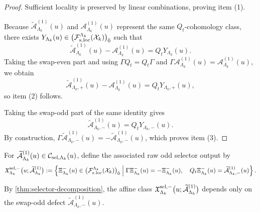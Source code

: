\documentclass[11pt]{article}
\begin{document}
\begin{proof}
Sufficient locality is preserved by linear combinations, proving item (1).

Because
\(
\widetilde{\mathcal A}^{(1)}_{\Lambda_k}(u)
\)
and
\(
\mathcal A^{(1)}_{\Lambda_k}(u)
\)
represent the same \(Q_t\)-cohomology class, there exists
\(
Y_{\Lambda_k}(u)\in
\big(\mathcal F_{\rm s.loc}^{\Lambda_k}(\mathcal X_k)\big)_{\bar 0}
\)
such that
\[
\widetilde{\mathcal A}^{(1)}_{\Lambda_k}(u)
-
\mathcal A^{(1)}_{\Lambda_k}(u)
=
Q_tY_{\Lambda_k}(u).
\]
Taking the swap-even part and using
\(
\Gamma Q_t=Q_t\Gamma
\)
and
\(
\Gamma\mathcal A^{(1)}_{\Lambda_k}(u)=\mathcal A^{(1)}_{\Lambda_k}(u)
\),
we obtain
\[
\widetilde{\mathcal A}^{(1)}_{\Lambda_k,+}(u)
-
\mathcal A^{(1)}_{\Lambda_k}(u)
=
Q_tY_{\Lambda_k,+}(u),
\]
so item (2) follows.

Taking the swap-odd part of the same identity gives
\[
\widetilde{\mathcal A}^{(1)}_{\Lambda_k,-}(u)
=
Q_tY_{\Lambda_k,-}(u).
\]
By construction,
\(
\Gamma\widetilde{\mathcal A}^{(1)}_{\Lambda_k,-}(u)
=
-\widetilde{\mathcal A}^{(1)}_{\Lambda_k,-}(u)
\),
which proves item (3).
\end{proof}

\begin{definition}
\label{def:selector-affine-class}
For
\(
\widetilde{\mathcal A}^{(1)}_{\Lambda_k}(u)\in\mathcal C_{{\rm sel},\Lambda_k}(u)
\),
define the associated raw odd selector output by
\[
\mathfrak X_{\Lambda_k}^{{\rm sel},-}
\big(u;\widetilde{\mathcal A}^{(1)}_{\Lambda_k}\big)
:=
\left\{
\Xi^-_{\Lambda_k}(u)
\in
\big(\mathcal F_{\rm s.loc}^{\Lambda_k}(\mathcal X_k)\big)_{\bar 0}
\;\middle|\;
\Gamma\Xi^-_{\Lambda_k}(u)=-\Xi^-_{\Lambda_k}(u),
\quad
Q_t\Xi^-_{\Lambda_k}(u)
=
\widetilde{\mathcal A}^{(1)}_{\Lambda_k,-}(u)
\right\}.
\]
\end{definition}

\begin{remark}
\label{rem:selector-odd-defect-only}
By \cref{thm:selector-decomposition}, the affine class
\(
\mathfrak X_{\Lambda_k}^{{\rm sel},-}
\big(u;\widetilde{\mathcal A}^{(1)}_{\Lambda_k}\big)
\)
depends only on the swap-odd defect
\(
\widetilde{\mathcal A}^{(1)}_{\Lambda_k,-}(u)
\).
\end{remark}
\end{document}
